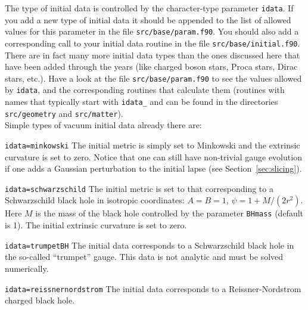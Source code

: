\documentclass[12pt]{article}
\begin{document}
The type of initial data is controlled by the character-type parameter
\texttt{idata}.  If you add a new type of initial data it should be
appended to the list of allowed values for this parameter in the file
\texttt{src/base/param.f90}.  You should also add a corresponding call
to your initial data routine in the file
\texttt{src/base/initial.f90}. \\

There are in fact many more initial data types than the ones discussed
here that have been added through the years (like charged boson stars,
Proca stars, Dirac stars, etc.). Have a look at the file
\texttt{src/base/param.f90} to see the values allowed by
\texttt{idata}, and the corresponding routines that calculate them
(routines with names that typically start with \texttt{idata\_} and
can be found in the directories \texttt{src/geometry} and
\texttt{src/matter}). \\

Simple types of vacuum initial data already there are:

\begin{list}{}{
\setlength{\leftmargin}{55mm}
\setlength{\labelsep}{10mm}
\setlength{\labelwidth}{50mm}}

\item[\texttt{idata=minkowski}] The initial metric is simply set to
  Minkowski and the extrinsic curvature is set to zero.  Notice that
  one can still have non-trivial gauge evolution if one adds a
  Gaussian perturbation to the initial lapse (see
  Section~\ref{sec:slicing}).

\item[\texttt{idata=schwarzschild}] The initial metric is set to that
  corresponding to a Schwarzschild black hole in isotropic coordinates:
  $A=B=1$, $\psi=1 + M/(2r^2)$. Here $M$ is the mass of the black
  hole controlled by the parameter \texttt{BHmass} (default is 1).
  The initial extrinsic curvature is set to zero.

\item[\texttt{idata=trumpetBH}] The initial data corresponds to a
  Schwarzschild black hole in the so-called ``trumpet'' gauge. This
  data is not analytic and must be solved numerically.

\item[\texttt{idata=reissnernordstrom}] The initial data corresponds
to a Reissner-Nordstrom charged black hole.

\end{list}

\vspace{5mm}
\end{document}
